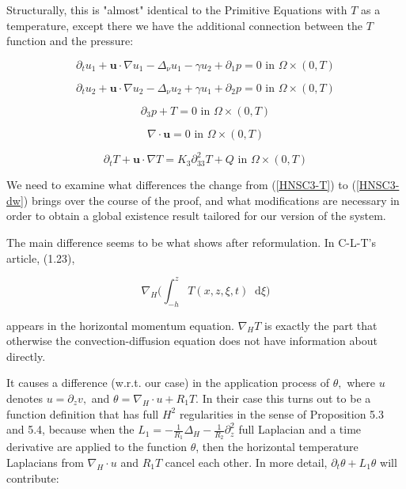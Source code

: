 \documentclass[11pt]{article}
\newcommand*\diff{\mathop{}\!\mathrm{d}}
\begin{document}
Structurally, this is "almost" identical to the Primitive Equations with $T$ as a temperature, except there we have the additional connection between the $T$ function and the pressure:

    \begin{equation} \label{HNSC1-T}    
    \partial_t u_1 + \mathbf{u} \cdot \nabla u_1 - \Delta_\nu u_1 - \gamma u_2 + \partial_1 p = 0 \text{ in } \Omega \times (0,T)
    \end{equation}
    
    \begin{equation} \label{HNSC2-T}   
    \partial_t u_2 + \mathbf{u} \cdot \nabla u_2 - \Delta_\nu u_2 + \gamma u_1 + \partial_2 p = 0 \text{ in } \Omega \times (0,T)
    \end{equation}
    
    \begin{equation} \label{HNSC3-T}   
    \partial_3 p + T = 0 \text{ in } \Omega \times (0,T)
    \end{equation}
    
    \begin{equation} \label{HNSC4-T}   
    \nabla \cdot \mathbf{u} = 0 \text{ in } \Omega \times (0,T)
    \end{equation}
    
    \begin{equation} \label{HNSC5-T}   
    \partial_t T + \mathbf{u} \cdot \nabla T =  K_3 \partial_{33} ^2 T + Q \text{ in } \Omega \times (0,T)
    \end{equation}
    
We need to examine what differences the change from (\ref{HNSC3-T}) to (\ref{HNSC3-dw}) brings over the course of the proof, and what modifications are necessary in order to obtain a global existence result tailored for our version of the system.

The main difference seems to be what shows after reformulation. In C-L-T's article, (1.23),

$$ \nabla_H \bigg (\int_{-h}^z T (x,z,\xi,t ) \diff \xi \bigg) $$

appears in the horizontal momentum equation. $\nabla_H T$ is exactly the part that otherwise the convection-diffusion equation does not have information about directly.

It causes a difference (w.r.t. our case) in the application process of $\theta,$ where $u$ denotes $u = \partial_z v,$ and $ \theta = \nabla_H \cdot u + R_1 T.$ In their case this turns out to be a function definition that has full $H^2$ regularities in the sense of Proposition 5.3 and 5.4, because when the $L_1 = - \frac{1}{R_1} \Delta_H - \frac{1}{R_2} \partial_z^2$ full Laplacian and a time derivative are applied to the function $\theta$, then the horizontal temperature Laplacians from $\nabla_H \cdot u$ and $R_1 T$ cancel each other.
In more detail, $\partial_t \theta + L_1 \theta$ will contribute:
\end{document}
